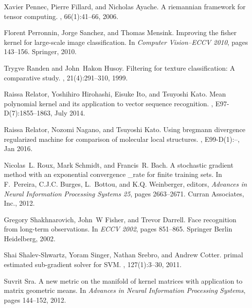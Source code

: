 \documentclass[10pt,onecolumn]{article}
\theoremstyle{definition}
\theoremstyle{definition}
\theoremstyle{definition}
\theoremstyle{definition}
\theoremstyle{definition}
\theoremstyle{theorem}
\newcommand{\0}{{\bm{0}}}
\newcommand{\1}{{\bm{1}}}
\begin{document}
\begin{thebibliography}{10}
Xavier Pennec, Pierre Fillard, and Nicholas Ayache.
\newblock A riemannian framework for tensor computing.
, 66(1):41--66, 2006.

Florent Perronnin, Jorge Sanchez, and Thomas Mensink.
\newblock Improving the fisher kernel for large-scale image classification.
\newblock In {\em Computer Vision--ECCV 2010}, pages 143--156. Springer, 2010.

Trygve Randen and John~Hakon Husoy.
\newblock Filtering for texture classification: A comparative study.
, 21(4):291--310, 1999.

Raissa Relator, Yoshihiro Hirohashi, Eisuke Ito, and Tsuyoshi Kato.
\newblock Mean polynomial kernel and its application to vector sequence
  recognition.
,
  E97-D(7):1855--1863, July 2014.

Raissa Relator, Nozomi Nagano, and Tsuyoshi Kato.
\newblock Using bregmann divergence regularized machine for comparison of
  molecular local structures.
, E99-D(1):--, Jan
  2016.

Nicolas~L. Roux, Mark Schmidt, and Francis~R. Bach.
\newblock A stochastic gradient method with an exponential convergence \_rate
  for finite training sets.
\newblock In F.~Pereira, C.J.C. Burges, L.~Bottou, and K.Q. Weinberger,
  editors, {\em Advances in Neural Information Processing Systems 25}, pages
  2663--2671. Curran Associates, Inc., 2012.

Gregory Shakhnarovich, John~W Fisher, and Trevor Darrell.
\newblock Face recognition from long-term observations.
\newblock In {\em ECCV 2002}, pages 851--865. Springer Berlin Heidelberg, 2002.

Shai Shalev-Shwartz, Yoram Singer, Nathan Srebro, and Andrew Cotter.
 primal estimated sub-gradient solver for {SVM}.
, 127(1):3--30, 2011.

Suvrit Sra.
\newblock A new metric on the manifold of kernel matrices with application to
  matrix geometric means.
\newblock In {\em Advances in Neural Information Processing Systems}, pages
  144--152, 2012.


\end{thebibliography}
\end{document}
